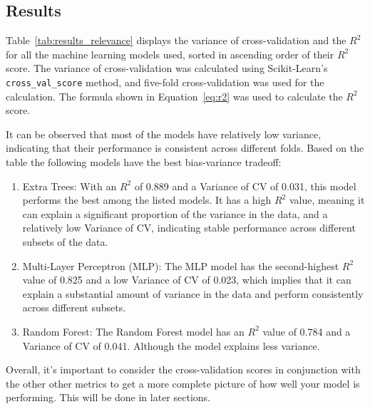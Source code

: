 \subsection{Results}\label{subsec:results3}

Table~\ref*{tab:results_relevance} displays the variance of cross-validation and the $R^2$ for all the machine
learning models used, sorted in ascending order of their $R^2$ score. The variance of cross-validation was calculated
using Scikit-Learn's \texttt{cross\_val\_score} method, and five-fold cross-validation was used for the calculation.
The formula shown in Equation~\ref{eq:r2} was used to calculate the $R^2$ score.

It can be observed that most of the models have relatively low variance, indicating that their performance is
consistent across different folds.
Based on the table the following models have the best bias-variance tradeoff:

\begin{enumerate}
    \item Extra Trees: With an $R^2$ of 0.889 and a Variance of CV of 0.031, this model performs the best among
    the listed models. It has a high $R^2$ value, meaning it can explain a significant proportion of the
    variance in the data, and a relatively low Variance of CV, indicating stable performance across different
    subsets of the data.
    \item Multi-Layer Perceptron (MLP): The MLP model has the second-highest $R^2$ value of 0.825 and a low Variance
    of CV
    of 0.023, which implies that it can explain a substantial amount of variance in the data and perform
    consistently across different subsets.
    \item Random Forest: The Random Forest model has an $R^2$ value of 0.784 and a Variance of CV of 0.041.
    Although the model explains less variance.
\end{enumerate}

Overall, it's important to consider the cross-validation scores in conjunction with
the other other metrics to get a more complete picture of how well your model is
performing. This will be done in later sections.

